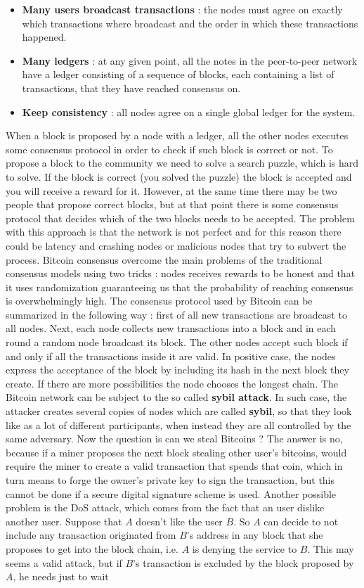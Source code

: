 \begin{itemize}
\item \textbf{Many users broadcast transactions} : the nodes must agree on exactly which transactions where broadcast and the order in which these transactions happened.
\item \textbf{Many ledgers} : at any given point, all the notes in the peer-to-peer network have a ledger consisting of a sequence of blocks, each containing a list of transactions, that they have reached consensus on.
\item \textbf{Keep consistency} : all nodes agree on a single global ledger for the system.
\end{itemize}
When a block is proposed by a node with a ledger, all the other nodes executes some consensus protocol in order to check if such block is correct or not. To propose a block to the community we need to solve a search puzzle, which is hard to solve. If the block is correct (you solved the puzzle) the block is accepted and you will receive a reward for it. However, at the same time there may be two people that propose correct blocks, but at that point there is some consensus protocol that decides which of the two blocks needs to be accepted. The problem with this approach is that the network is not perfect and for this reason there could be latency and crashing nodes or malicious nodes that try to subvert the process. Bitcoin consensus overcome the main problems of the traditional consensus models using two tricks : nodes receives rewards to be honest and that it uses randomization guaranteeing us that the probability of reaching consensus is overwhelmingly high. The consensus protocol used by Bitcoin can be summarized in the following way : first of all new transactions are broadcast to all nodes. Next, each node collects new transactions into a block and in each round a random node broadcast its block. The other nodes accept such block if and only if all the transactions inside it are valid. In positive case, the nodes express the acceptance of the block by including its hash in the next block they create. If there are more possibilities the node chooses the longest chain. The Bitcoin network can be subject to the so called \textbf{sybil attack}. In such case, the attacker creates several copies of nodes which are called \textbf{sybil}, so that they look like as a lot of different participants, when instead they are all controlled by the same adversary. Now the question is can we steal Bitcoins ? The answer is no, because if a miner proposes the next block stealing other user's bitcoins, would require the miner to create a valid transaction that spends that coin, which in turn means to forge the owner's private key to sign the transaction, but this cannot be done if a secure digital signature scheme is used. Another possible problem is the DoS attack, which comes from the fact that an user dislike another user. Suppose that $A$ doesn't like the user $B$. So $A$ can decide to not include any transaction originated from $B$'s address in any block that she proposes to get into the block chain, i.e. $A$ is denying the service to $B$. This may seems a valid attack, but if $B$'s transaction is excluded by the block proposed by $A$, he needs just to wait 